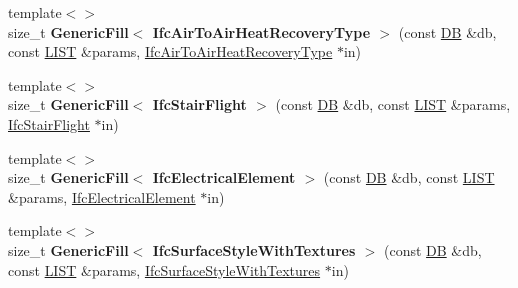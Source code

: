 \begin{DoxyCompactItemize}
\item 
\hypertarget{namespace_assimp_1_1_s_t_e_p_a50f074278a04d1c2c2382ca4017c9e6d}{{\footnotesize template$<$$>$ }\\size\+\_\+t {\bfseries Generic\+Fill$<$ Ifc\+Air\+To\+Air\+Heat\+Recovery\+Type $>$} (const \hyperlink{class_assimp_1_1_s_t_e_p_1_1_d_b}{D\+B} \&db, const \hyperlink{class_assimp_1_1_s_t_e_p_1_1_e_x_p_r_e_s_s_1_1_l_i_s_t}{L\+I\+S\+T} \&params, \hyperlink{struct_assimp_1_1_i_f_c_1_1_ifc_air_to_air_heat_recovery_type}{Ifc\+Air\+To\+Air\+Heat\+Recovery\+Type} $\ast$in)}\label{namespace_assimp_1_1_s_t_e_p_a50f074278a04d1c2c2382ca4017c9e6d}

\item 
\hypertarget{namespace_assimp_1_1_s_t_e_p_a8460ee4900c35da8ef0d33bc34ef8d79}{{\footnotesize template$<$$>$ }\\size\+\_\+t {\bfseries Generic\+Fill$<$ Ifc\+Stair\+Flight $>$} (const \hyperlink{class_assimp_1_1_s_t_e_p_1_1_d_b}{D\+B} \&db, const \hyperlink{class_assimp_1_1_s_t_e_p_1_1_e_x_p_r_e_s_s_1_1_l_i_s_t}{L\+I\+S\+T} \&params, \hyperlink{struct_assimp_1_1_i_f_c_1_1_ifc_stair_flight}{Ifc\+Stair\+Flight} $\ast$in)}\label{namespace_assimp_1_1_s_t_e_p_a8460ee4900c35da8ef0d33bc34ef8d79}

\item 
\hypertarget{namespace_assimp_1_1_s_t_e_p_a065a9cc37483b4f7a8155ebab5787f69}{{\footnotesize template$<$$>$ }\\size\+\_\+t {\bfseries Generic\+Fill$<$ Ifc\+Electrical\+Element $>$} (const \hyperlink{class_assimp_1_1_s_t_e_p_1_1_d_b}{D\+B} \&db, const \hyperlink{class_assimp_1_1_s_t_e_p_1_1_e_x_p_r_e_s_s_1_1_l_i_s_t}{L\+I\+S\+T} \&params, \hyperlink{struct_assimp_1_1_i_f_c_1_1_ifc_electrical_element}{Ifc\+Electrical\+Element} $\ast$in)}\label{namespace_assimp_1_1_s_t_e_p_a065a9cc37483b4f7a8155ebab5787f69}

\item 
\hypertarget{namespace_assimp_1_1_s_t_e_p_af416b2b9293a08953894ceb3c0a14d51}{{\footnotesize template$<$$>$ }\\size\+\_\+t {\bfseries Generic\+Fill$<$ Ifc\+Surface\+Style\+With\+Textures $>$} (const \hyperlink{class_assimp_1_1_s_t_e_p_1_1_d_b}{D\+B} \&db, const \hyperlink{class_assimp_1_1_s_t_e_p_1_1_e_x_p_r_e_s_s_1_1_l_i_s_t}{L\+I\+S\+T} \&params, \hyperlink{struct_assimp_1_1_i_f_c_1_1_ifc_surface_style_with_textures}{Ifc\+Surface\+Style\+With\+Textures} $\ast$in)}\label{namespace_assimp_1_1_s_t_e_p_af416b2b9293a08953894ceb3c0a14d51}


\end{DoxyCompactItemize}
